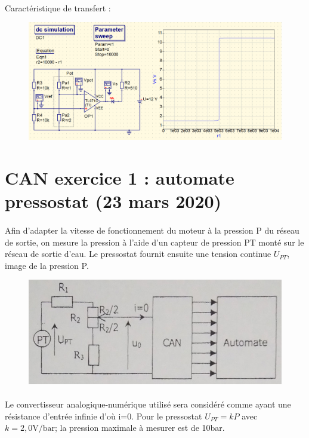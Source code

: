 \documentclass{article}
\begin{document}
\paragraph{}
Caractéristique de transfert :
\begin{figure}[H]
    \centering
    \includegraphics[width=.95\linewidth]{./images/labo3-qucs-caract-transfert.png}
\end{figure}



\newpage
\section{CAN exercice 1 : automate pressostat (23 mars 2020)}
\paragraph{}
Afin d'adapter la vitesse de fonctionnement du moteur à la pression P du réseau de sortie, on mesure la pression à l'aide d'un capteur de pression PT monté sur le réseau de sortie d'eau. Le pressostat fournit ensuite une tension continue $U_{PT}$, image de la pression P.

\begin{figure}[H]
    \centering
    \includegraphics[width=.6\linewidth]{images/acq-ex1-enonce.jpg}
\end{figure}

\paragraph{}
Le convertisseur analogique-numérique utilisé sera considéré comme ayant une résistance d'entrée infinie d'où i=0. Pour le pressostat $U_{PT} = kP$ avec $k = 2,0\si{\volt\per\bar}$; la pression maximale à mesurer est de 10\si{\bar}.
\end{document}
